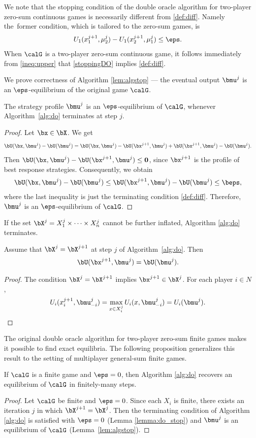We note that the stopping condition of the double oracle algorithm for two-player zero-sum continuous games \cite{Adam21} is necessarily different from \eqref{def:diff}. Namely the~former condition, which is tailored to the zero-sum games, is
\begin{equation} \label{stoppingDO}
	U_1(x_1^{j+1},\mu_2^j) - U_1(x_2^{j+1},\mu_1^j) \le \eps.
\end{equation}
When $\calG$ is a two-player zero-sum continuous game, it follows immediately from \eqref{ineq:upper} that \eqref{stoppingDO} implies \eqref{def:diff}.

We prove correctness of Algorithm \ref{lem:algstop} --- the eventual output $\bmu^j$ is an $\eps$-equilibrium of the original game $\calG$.
\begin{lemma}\label{lem:algstop}
	The strategy profile $\bmu^j$ is an $\eps$-equilibrium of $\calG$, whenever Algorithm~\ref{alg:do} terminates at step $j$.
\end{lemma}
\begin{proof}
	Let $\bx\in \bX$. We get
	\[
		\bU(\bx,\bmu^j)-\bU(\bmu^j) = \bU(\bx,\bmu^j)-\bU(\bx^{j+1},\bmu^j) +  \bU(\bx^{j+1},\bmu^j)-\bU(\bmu^j).
	\]
	Then $\bU(\bx,\bmu^j)-\bU(\bx^{j+1},\bmu^j)\leq \mathbf{0}$, since $\bx^{j+1}$ is the profile of best response strategies. Consequently, we obtain
	\[
		\bU(\bx,\bmu^j)-\bU(\bmu^j)  \le  \bU(\bx^{j+1},\bmu^j)-\bU(\bmu^j) \le \beps,
	\]
	where the last inequality is just the terminating condition \eqref{def:diff}. Therefore, $\bmu^j$ is an $\eps$-equilibrium of  $\calG$.
\end{proof}

If the set $\bX^j=X^j_1\times \dots \times X^j_n$ cannot be further inflated, Algorithm \ref{alg:do} terminates.
\begin{lemma}\label{lemma:do_stop}
	Assume that $\bX^j=\bX^{j+1}$ at step $j$ of Algorithm~\ref{alg:do}. Then
	\[
		\bU(\bx^{j+1},\bmu^j)=\bU(\bmu^j).
	\]
\end{lemma}
\begin{proof}
	The condition $\bX^j=\bX^{j+1}$ implies $\bx^{j+1}\in \bX^{j}$. For each player $i\in N$,
	\[
		U_i(x_i^{j+1},\bmu^j_{-i})=\max\limits_{x\in X_i^j}U_i(x,\bmu^j_{-i}) =U_i(\bmu^j).
	\]
\end{proof}

The original double oracle algorithm for two-player zero-sum finite games \cite{McMahan03} makes it possible to find exact equilibria. The following proposition generalizes this result to the setting of multiplayer general-sum finite games.
\begin{proposition}\label{pro:Mahan}
	If $\calG$ is a finite game and $\eps=0$, then Algorithm \ref{alg:do} recovers an equilibrium of $\calG$ in finitely-many steps.
\end{proposition}
\begin{proof}
	Let $\calG$ be finite and $\eps=0$. Since each $X_i$ is finite, there exists an iteration $j$  in which $\bX^{j+1}=\bX^j$. Then the terminating condition of Algorithm \ref{alg:do} is satisfied with $\eps=0$ (Lemma \ref{lemma:do_stop}) and $\bmu^j$ is an equilibrium of $\calG$ (Lemma~\ref{lem:algstop}).
\end{proof}

